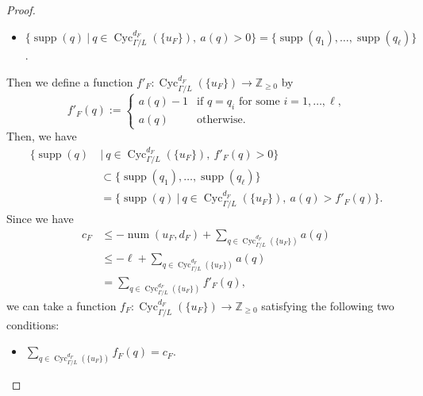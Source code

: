\begin{proof}
\begin{itemize}
\item 
$\bigl\{ \operatorname{supp}(q) \ \big| \  q \in \operatorname{Cyc}_{\Gamma /L}^{d_F} (\{ u_F \}),\ a(q)>0 \bigr \}
= \{ \operatorname{supp}(q_1), \ldots ,  \operatorname{supp}(q_{\ell}) \}$. 
\end{itemize} 
Then we define a function $f' _F: \operatorname{Cyc}_{\Gamma /L}^{d_F} (\{ u_F \}) \to \mathbb{Z}_{\ge 0} $ by 
\[
f'_F (q) := 
\begin{cases}
a(q)-1 & \text{if $q = q_i$ for some $i = 1, \ldots , \ell$,}\\
a(q) & \text{otherwise.}
\end{cases}
\]
Then, we have 
\begin{align*}\tag{i}
\bigl\{ \operatorname{supp}(q) \  & \big| \  q \in \operatorname{Cyc}_{\Gamma /L}^{d_F} (\{ u_F \}),\ f'_F(q)>0 \bigr \} \\
&\subset \{ \operatorname{supp}(q_1), \ldots ,  \operatorname{supp}(q_{\ell})  \} \\
&= \bigl\{ \operatorname{supp}(q) \ \big| \  q \in \operatorname{Cyc}_{\Gamma /L}^{d_F} (\{ u_F \}),\ a(q)>f'_F(q) \bigr \}. 
\end{align*}
Since we have
\begin{align*}
c_F 
& \le 
- \operatorname{num}(u_F, d_F) + \sum _{q \in \operatorname{Cyc}_{\Gamma /L}^{d_F} (\{ u_F \})} a(q) \\
& \le 
- \ell + \sum _{q \in \operatorname{Cyc}_{\Gamma /L}^{d_F} (\{ u_F \})} a(q) \\
& =
\sum _{q \in \operatorname{Cyc}_{\Gamma /L}^{d_F} (\{ u_F \})} f' _F(q), 
\end{align*}
we can take a function $f_F : \operatorname{Cyc}_{\Gamma /L}^{d_F} (\{ u_F \}) \to \mathbb{Z}_{\ge 0}$ satisfying the following two conditions:
\begin{itemize}
\item[(ii)] 
$\sum _{q \in \operatorname{Cyc}_{\Gamma /L}^{d_F} (\{ u_F \})} f_F(q) = c_F$. 


\end{itemize}
\end{proof}

